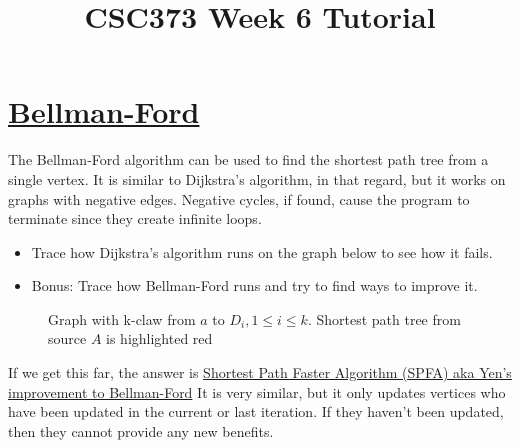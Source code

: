 \documentclass[]{article}
\title{CSC373 Week 6 Tutorial}
\author{}
\begin{document}
\maketitle


\section{\href{https://web.stanford.edu/class/archive/cs/cs161/cs161.1138/lectures/18/Small18.pdf}{Bellman-Ford}}
The Bellman-Ford algorithm can be used to find the shortest path tree from a single vertex. It is similar to Dijkstra's algorithm, in that regard, but it works on graphs with negative edges. Negative cycles, if found, cause the program to terminate since they create infinite loops.

\begin{itemize}
	\item Trace how Dijkstra's algorithm runs on the graph below to see how it fails.
	\item Bonus: Trace how Bellman-Ford runs and try to find ways to improve it.
\end{itemize}

\begin{figure}
	\centering
	\caption{Graph with k-claw from $a$ to $D_i, 1 \leq i \leq k$. Shortest path tree from source $A$ is highlighted red}
\end{figure}
If we get this far, the answer is \href{https://wcipeg.com/wiki/Shortest_Path_Faster_Algorithm}{Shortest Path Faster Algorithm (SPFA) aka Yen's improvement to Bellman-Ford}
It is very similar, but it only updates vertices who have been updated in the current or last iteration. If they haven't been updated, then they cannot provide any new benefits.
\end{document}
